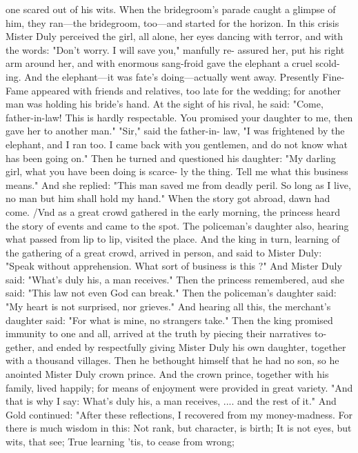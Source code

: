 \documentclass{book}
\begin{document}
one scared out of his wits. When the bridegroom's
parade caught a glimpse of him, they ran---the
bridegroom, too---and started for the horizon.
In this crisis Mister Duly perceived the girl, all
alone, her eyes dancing with terror, and with the
words: "Don't worry. I will save you," manfully re-
assured her, put his right arm around her, and with
enormous sang-froid gave the elephant a cruel scold-
ing. And the elephant---it was fate's doing---actually
went away.
Presently Fine-Fame appeared with friends and
relatives, too late for the wedding; for another man
was holding his bride's hand. At the sight of his
rival, he said: "Come, father-in-law! This is hardly
respectable. You promised your daughter to me, then
gave her to another man." "Sir," said the father-in-
law, "I was frightened by the elephant, and I ran too.
I came back with you gentlemen, and do not know
what has been going on."
Then he turned and questioned his daughter:
"My darling girl, what you have been doing is scarce-
ly the thing. Tell me what this business means." And
she replied: "This man saved me from deadly peril.
So long as I live, no man but him shall hold my hand."
When the story got abroad, dawn had come. /Vnd
as a great crowd gathered in the early morning, the
princess heard the story of events and came to the
spot. The policeman's daughter also, hearing what
passed from lip to lip, visited the place. And the king
in turn, learning of the gathering of a great crowd,
arrived in person, and said to Mister Duly: "Speak
without apprehension. What sort of business is this ?"
And Mister Duly said:
"What's duly his, a man receives."
Then the princess remembered, aud she said:
"This law not even God can break."
Then the policeman's daughter said:
"My heart is not surprised, nor grieves."
And hearing all this, the merchant's daughter said:
"For what is mine, no strangers take."
Then the king promised immunity to one and all,
arrived at the truth by piecing their narratives to-
gether, and ended by respectfully giving Mister Duly
his own daughter, together with a thousand villages.
Then he bethought himself that he had no son, so he
anointed Mister Duly crown prince. And the crown
prince, together with his family, lived happily; for
means of enjoyment were provided in great variety.
"And that is why I say:
What's duly his, a man receives, ....
and the rest of it." And Gold continued:
"After these reflections, I recovered from my
money-madness. For there is much wisdom in this:
Not rank, but character, is birth;
It is not eyes, but wits, that see;
True learning 'tis, to cease from wrong;
\end{document}
